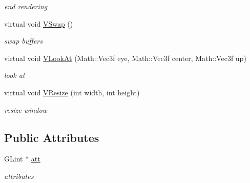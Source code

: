 \begin{DoxyCompactItemize}
\begin{DoxyCompactList}\small\item\em end rendering \item\end{DoxyCompactList}\item 
\hypertarget{classPlatform_1_1Renderer_1_1RendererGL_adc42f2800dc18dcbe268328b42c8a9c1}{
virtual void \hyperlink{classPlatform_1_1Renderer_1_1RendererGL_adc42f2800dc18dcbe268328b42c8a9c1}{VSwap} ()}
\label{classPlatform_1_1Renderer_1_1RendererGL_adc42f2800dc18dcbe268328b42c8a9c1}

\begin{DoxyCompactList}\small\item\em swap buffers \item\end{DoxyCompactList}\item 
\hypertarget{classPlatform_1_1Renderer_1_1RendererGL_acd7cc346e747ea07b065aebe99b76cb3}{
virtual void \hyperlink{classPlatform_1_1Renderer_1_1RendererGL_acd7cc346e747ea07b065aebe99b76cb3}{VLookAt} (Math::Vec3f eye, Math::Vec3f center, Math::Vec3f up)}
\label{classPlatform_1_1Renderer_1_1RendererGL_acd7cc346e747ea07b065aebe99b76cb3}

\begin{DoxyCompactList}\small\item\em look at \item\end{DoxyCompactList}\item 
\hypertarget{classPlatform_1_1Renderer_1_1RendererGL_ae3d708548b2390aa953b4e9738e1e8ba}{
virtual void \hyperlink{classPlatform_1_1Renderer_1_1RendererGL_ae3d708548b2390aa953b4e9738e1e8ba}{VResize} (int width, int height)}
\label{classPlatform_1_1Renderer_1_1RendererGL_ae3d708548b2390aa953b4e9738e1e8ba}

\begin{DoxyCompactList}\small\item\em resize window \item\end{DoxyCompactList}\end{DoxyCompactItemize}
\subsection*{Public Attributes}
\begin{DoxyCompactItemize}
\item 
\hypertarget{classPlatform_1_1Renderer_1_1RendererGL_ab78dc8ccc2d90acbc3a36feef49a523e}{
GLint $\ast$ \hyperlink{classPlatform_1_1Renderer_1_1RendererGL_ab78dc8ccc2d90acbc3a36feef49a523e}{att}}
\label{classPlatform_1_1Renderer_1_1RendererGL_ab78dc8ccc2d90acbc3a36feef49a523e}

\begin{DoxyCompactList}\small\item\em attributes \item\end{DoxyCompactList}\end{DoxyCompactItemize}


